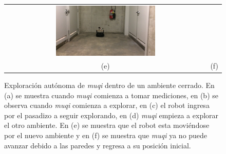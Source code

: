 \begin{figure}
\begin{tabular}{cc}
    \includegraphics[width=0.507\textwidth]{images/KobukiSotano6.JPG}\\
    (e)&(f)
  \end{tabular}
  \captionsetup{font=footnotesize}
  \caption{Exploración autónoma de \textit{muqi} dentro de un ambiente 
  cerrado. En (a) se muestra cuando \textit{muqi} comienza a tomar 
  mediciones, en (b) se observa cuando \textit{muqi} comienza a explorar, 
  en (c) el robot ingresa por el pasadizo a seguir explorando, en (d) 
  \textit{muqi} empieza a explorar el otro ambiente. En (e) se muestra que 
  el robot esta moviéndose por el nuevo ambiente y en (f) se muestra que 
  \textit{muqi} ya no puede avanzar debido a las paredes y regresa a su 
  posición inicial.}
  \label{fig:exploracionMuqi}
\end{figure}



